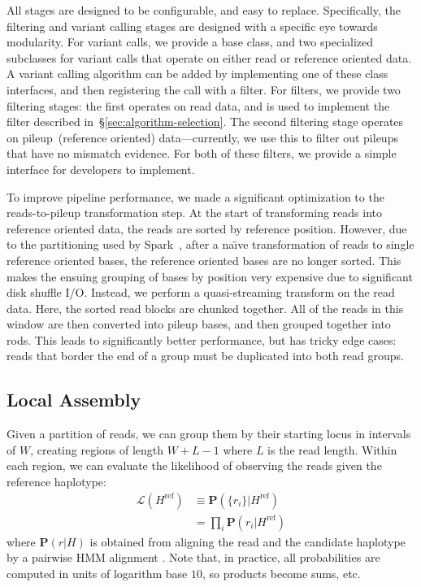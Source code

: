 \documentclass{acm_proc_article-sp}
\begin{document}
All stages are designed to be configurable, and easy to replace. Specifically, the filtering and variant calling stages are designed
with a specific eye towards modularity. For variant calls, we provide a base class, and two specialized subclasses for variant
calls that operate on either read or reference oriented data. A variant calling algorithm can be added by implementing one
of these class interfaces, and then registering the call with a filter. For filters, we provide two filtering stages: the first operates
on read data, and is used to implement the filter described in~\S\ref{sec:algorithm-selection}. The second filtering stage operates
on pileup~(reference oriented) data---currently, we use this to filter out pileups that have no mismatch evidence. For both of these
filters, we provide a simple interface for developers to implement.

To improve pipeline performance, we made a significant optimization to the reads-to-pileup transformation step. At the start of
transforming reads into reference oriented data, the reads are sorted by reference position. However, due to the partitioning
used by Spark~\cite{zaharia10}, after a na\"{\i}ve transformation of reads to single reference oriented bases, the reference
oriented bases are no longer sorted. This makes the ensuing grouping of bases by position very expensive due to significant disk
shuffle I/O. Instead, we perform a quasi-streaming transform on the read data. Here, the sorted read blocks are chunked together.
All of the reads in this window are then converted into pileup bases, and then grouped together into rods. This leads to significantly
better performance, but has tricky edge cases: reads that border the end of a group must be duplicated into both read groups.

\subsection{Local Assembly}
\label{sec:local-assembly}


Given a partition of reads, we can group them by their starting locus in
intervals of $W$, creating regions of length $W+L-1$ where $L$ is the
read length.
Within each region, we can evaluate the likelihood of observing the reads
given the reference haplotype:
\begin{align}
  \mathcal L(H^\text{ref})
  &\equiv\mathbf P(\{r_i\}|H^\text{ref}) \\ \nonumber
  &=\prod_i\mathbf P(r_i|H^\text{ref})
\end{align}
where $\mathbf P(r|H)$ is obtained from aligning the read and the
candidate haplotype by a pairwise HMM alignment \cite{durbin98}.
Note that, in practice, all probabilities are computed in units of logarithm
base $10$, so products become sums, etc.
\end{document}
